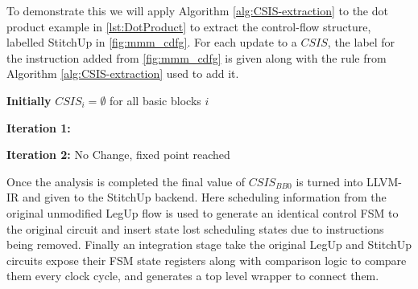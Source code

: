 To demonstrate this we will apply Algorithm \ref{alg:CSIS-extraction} to the
dot product example in \ref{lst:DotProduct} to extract the control-flow structure, 
labelled StitchUp in \ref{fig:mmm_cdfg}. 
For each update to a $CSIS$, the label for the instruction added from \ref{fig:mmm_cdfg} is given 
along with the rule from Algorithm \ref{alg:CSIS-extraction} used to add it. 

\vspace{1mm}
\noindent
\textbf{Initially} $CSIS_{i} = \emptyset$ for all basic blocks $i$

\vspace{-2mm}
\noindent
\hrulefill

\vspace{-1mm}
\noindent
\textbf{Iteration 1:}


\vspace{1mm}
\noindent
\textbf{Iteration 2:}\hspace{3mm} No Change, fixed point reached

\vspace{1mm}


Once the analysis is completed the final value of $CSIS_{BB0}$ is turned into LLVM-IR
and given to the StitchUp backend.
Here scheduling information from the original unmodified LegUp flow is used to generate
an identical control FSM to the original circuit and insert state lost scheduling states
due to instructions being removed. 
Finally an integration stage take the original LegUp and StitchUp circuits expose their FSM state registers
along with comparison logic to compare them every clock cycle, and generates a top level wrapper to connect them.
